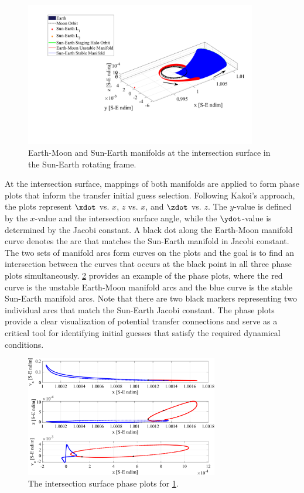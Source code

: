 \begin{figure}[H]
    \centering
    \includegraphics[width=0.9\textwidth]{figures/Hyperplane.pdf}
    \caption{Earth-Moon and Sun-Earth manifolds at the intersection surface in the Sun-Earth rotating frame.}
    \label{fig:hyperplane}
\end{figure}

At the intersection surface, mappings of both manifolds are applied to form phase plots that inform
the transfer initial guess selection. Following Kakoi's approach, the plots represent $\xdot$ vs.
$x$, $z$ vs. $x$, and $\zdot$ vs. $z$. The $y$-value is defined by the $x$-value and the
intersection surface angle, while the $\ydot$-value is determined by the Jacobi
constant\cite{Kakoi:2015}. A black dot along the Earth-Moon manifold curve denotes the arc that
matches the Sun-Earth manifold in Jacobi constant. The two sets of manifold arcs form curves on the
plots and the goal is to find an intersection between the curves that occurs at the black point in
all three phase plots simultaneously. \cref{fig:phasePlots} provides an example of the phase plots,
where the red curve is the unstable Earth-Moon manifold arcs and the blue curve is the stable
Sun-Earth manifold arcs. Note that there are two black markers representing two individual arcs
that match the Sun-Earth Jacobi constant. The phase plots provide a clear visualization of
potential transfer connections and serve as a critical tool for identifying initial guesses that
satisfy the required dynamical conditions.

\begin{figure}[H]
    \centering
    \includegraphics[width=0.75\textwidth]{figures/PhasePlots.pdf}
    \caption{The intersection surface phase plots for \cref{fig:hyperplane}.}
    \label{fig:phasePlots}
\end{figure}

